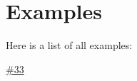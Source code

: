 \section{Examples}
Here is a list of all examples\+:\begin{DoxyCompactItemize}
\item 
\mbox{\hyperlink{#33-example}{\#33}}
\end{DoxyCompactItemize}
